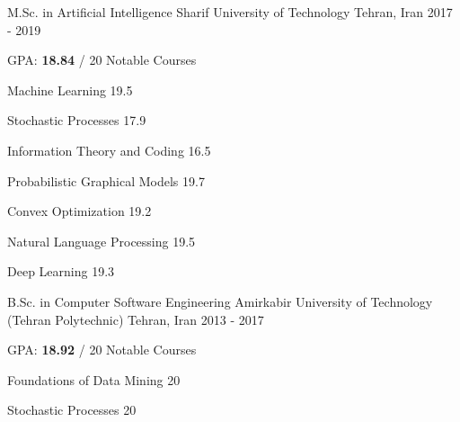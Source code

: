 \begin{cventries}
	\cventry
	{M.Sc. in Artificial Intelligence} %
	{Sharif University of Technology} %
	{Tehran, Iran} %
	{2017 - 2019} %
	{
		GPA: \textbf{18.84} / 20
		\newline
		\textcolor{awesome}{Notable Courses}
		\vspace{-.4cm}
		\begin{multicols}{3}
			\begin{cvitems}
				\item {Machine Learning\hspace{0.5cm} 19.5}
				\item {Stochastic Processes \hspace{0.5cm} 17.9}
				\item {Information Theory and Coding \hspace{0.5cm} 16.5}
				\item {Probabilistic Graphical Models \hspace{0.5cm} 19.7}
				\item {Convex Optimization \hspace{0.5cm} 19.2}
				\item {Natural Language Processing \hspace{0.5cm} 19.5}
				\item {Deep Learning \hspace{0.5cm} 19.3}
			\end{cvitems}
		\end{multicols}
	}
    \vspace{-.5cm}
	\cventry
	{B.Sc. in Computer Software Engineering} %
	{Amirkabir University of Technology {\scriptsize (Tehran Polytechnic)}} %
	{Tehran, Iran} %
	{2013 - 2017} %
	{
		GPA: \textbf{18.92} / 20
		\newline
		\textcolor{awesome}{Notable Courses}
		\vspace{-.4cm}
		\begin{multicols}{3}
			\begin{cvitems}
				\item {Foundations of Data Mining \hspace{0.5cm} 20}
				\item {Stochastic Processes \hspace{0.5cm} 20}

\end{cvitems}
\end{multicols}}
\end{cventries}
